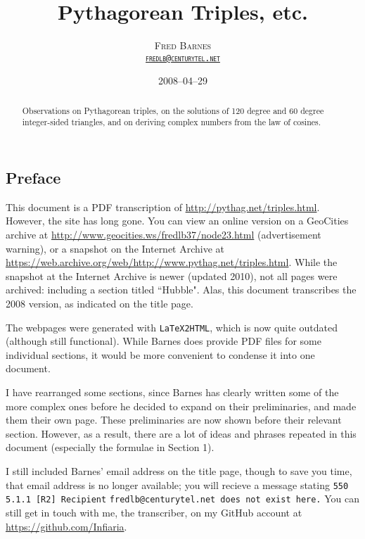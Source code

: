 \documentclass{article}
\title{\textbf{Pythagorean Triples, etc.}}
\author{\scshape{Fred Barnes}\\ \href{mailto:fredlb@centurytel.net}{\texttt{fredlb@centurytel.net}}}
\date{2008--04--29}
\theoremstyle{definition}
\begin{document}
\begin{titlepage}
\maketitle

\begin{abstract}
Observations on Pythagorean triples, on the solutions of 120 degree and 60 degree integer-sided triangles, and on deriving complex numbers from the law of cosines.
\end{abstract}

\tableofcontents

\clearpage

\section*{Preface}
\label{sec:Preface}

This document is a PDF transcription of \url{http://pythag.net/triples.html}. However, the site has long gone. You can view an online version on a GeoCities archive at \url{http://www.geocities.ws/fredlb37/node23.html} (advertisement warning), or a snapshot on the Internet Archive at \url{https://web.archive.org/web/http://www.pythag.net/triples.html}. While the snapshot at the Internet Archive is newer (updated 2010), not all pages were archived: including a section titled ``Hubble". Alas, this document transcribes the 2008 version, as indicated on the title page.

The webpages were generated with \texttt{LaTeX2HTML}, which is now quite outdated (although still functional). While Barnes does provide PDF files for some individual sections, it would be more convenient to condense it into one document.

I have rearranged some sections, since Barnes has clearly written some of the more complex ones before he decided to expand on their preliminaries, and made them their own page. These preliminaries are now shown before their relevant section. However, as a result, there are a lot of ideas and phrases repeated in this document (especially the formulae in Section 1).

I still included Barnes' email address on the title page, though to save you  time, that email address is no longer available; you will recieve a message stating \texttt{550 5.1.1 [R2] Recipient} \texttt{fredlb@centurytel.net does not exist here.} You can still get in touch with me, the transcriber, on my GitHub account at \url{https://github.com/Infiaria}.


\end{titlepage}
\end{document}
